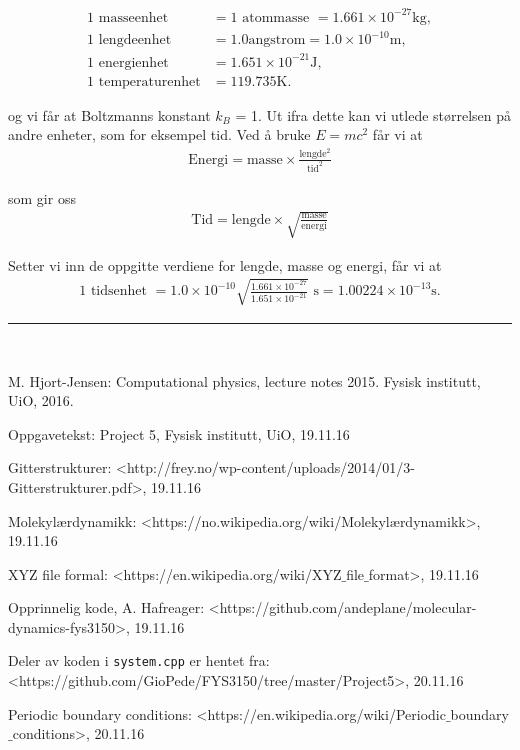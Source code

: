 \documentclass[paper=a4, fontsize=11pt]{scrartcl} %
\numberwithin{equation}{section} %
\numberwithin{figure}{section} %
\numberwithin{table}{section} %
\newcommand{\horrule}[1]{\rule{\linewidth}{#1}} %
\begin{document}
\begin{align}
	\text{1 masseenhet } &= 1 \text{ atommasse } = 1.661\times 10^{-27}\mathrm{kg},\\
	\text{1 lengdeenhet } &= 1.0 \mathrm{angstrom} = 1.0\times 10^{-10}\mathrm{m},\\
	\text{1 energienhet } &= 1.651\times 10^{-21}\mathrm{J},\\
	\text{1 temperaturenhet} &= 119.735\mathrm{K}.
\end{align}

og vi får at Boltzmanns konstant $k_B$ = 1. Ut ifra dette kan vi utlede størrelsen på andre enheter, som for eksempel tid. Ved å bruke $E = mc^2$ får vi at
\begin{align}
\text{Energi} = \text{masse} \times \frac{\text{lengde}^2}{\text{tid}^2}
\end{align}

som gir oss 
\begin{align}
\text{Tid} = \text{lengde} \times \sqrt{\frac{\text{masse}}{\text{energi}}}
\end{align}

Setter vi inn de oppgitte verdiene for lengde, masse og energi, får vi at
\begin{align}
\text{1 tidsenhet } = 1.0 \times 10^{-10}\sqrt{\frac{1.661\times 10^{-27}}{1.651\times 10^{-21}}} \text{ s} = 1.00224\times 10^{-13}\mathrm{s}.
\end{align}

\horrule{2pt} \\[0.5cm] %


\begin{thebibliography}{9}  
    
\bibitem{}
   M. Hjort-Jensen: Computational physics, lecture notes 2015. Fysisk institutt, UiO, 2016.

\bibitem{}
   Oppgavetekst: Project 5, Fysisk institutt, UiO, 19.11.16
   
\bibitem{}
 Gitterstrukturer: <http://frey.no/wp-content/uploads/2014/01/3-Gitterstrukturer.pdf>, 19.11.16  
 
 \bibitem{}
  Molekylærdynamikk: <https://no.wikipedia.org/wiki/Molekyl$æ$rdynamikk>, 19.11.16
  
\bibitem{}
 XYZ file formal: <https://en.wikipedia.org/wiki/XYZ$\_$file$\_$format>, 19.11.16
 
 \bibitem{}
 Opprinnelig kode, A. Hafreager: <https://github.com/andeplane/molecular-dynamics-fys3150>, 19.11.16
  
\bibitem{}
  Deler av koden i \texttt{system.cpp} er hentet fra: <https://github.com/GioPede/FYS3150/tree/master/Project5>,
  20.11.16
  
 \bibitem{}
 Periodic boundary conditions: <https://en.wikipedia.org/wiki/Periodic$\_$boundary$\_$conditions>, 20.11.16

   
\end{thebibliography}
\end{document}

